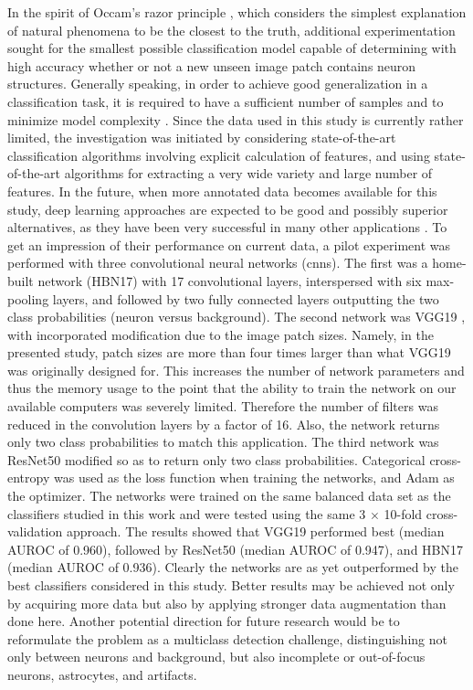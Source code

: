 In the spirit of Occam's razor principle \cite{iacca2012ockham, hong2013particle, ebrahimpour2017occam}, which considers the simplest explanation of natural phenomena to be the closest to the truth, additional experimentation sought for the smallest possible classification model capable of determining with high accuracy whether or not a new unseen image patch contains neuron structures. Generally speaking, in order to achieve good generalization in a classification task, it is required to have a sufficient number of samples and to minimize model complexity \cite{gupta2017sparse}. Since the data used in this study is currently rather limited, the investigation was initiated by considering state-of-the-art classification algorithms involving explicit calculation of features, and using state-of-the-art algorithms for extracting a very wide variety and large number of features. In the future, when more annotated data becomes available for this study, deep learning approaches are expected to be good and possibly superior alternatives, as they have been very successful in many other applications \cite{lecun2015deep, bianchini2014complexity, greenspan2016guest, tajbakhsh2016convolutional, shaikhina2017handling, litjens2017survey, shen2017deep}. To get an impression of their performance on current data, a pilot experiment was performed with three convolutional neural networks (\gls{cnn}s). The first was a home-built network (HBN17) with 17 convolutional layers, interspersed with six max-pooling layers, and followed by two fully connected layers outputting the two class probabilities (neuron versus background). The second network was VGG19 \cite{simonyan2014very}, with incorporated modification due to the image patch sizes. Namely, in the presented study, patch sizes are more than four times larger than what VGG19 was originally designed for. This increases the number of network parameters and thus the memory usage to the point that the ability to train the network on our available computers was severely limited. Therefore the number of filters was reduced in the convolution layers by a factor of 16. Also, the network returns only two class probabilities to match this application. The third network was ResNet50 \cite{he2016deep} modified so as to return only two class probabilities. Categorical cross-entropy \cite{ghosh2017robust} was used as the loss function when training the networks, and Adam \cite{kingma2014adam} as the optimizer. The networks were trained on the same balanced data set as the classifiers studied in this work and were tested using the same 3 $\times$ 10-fold cross-validation approach. The results showed that VGG19 performed best (median AUROC of 0.960), followed by ResNet50 (median AUROC of 0.947), and HBN17 (median AUROC of 0.936). Clearly the networks are as yet outperformed by the best classifiers considered in this study. Better results may be achieved not only by acquiring more data but also by applying stronger data augmentation than done here. Another potential direction for future research would be to reformulate the problem as a multiclass detection challenge, distinguishing not only between neurons and background, but also incomplete or out-of-focus neurons, astrocytes, and artifacts.

